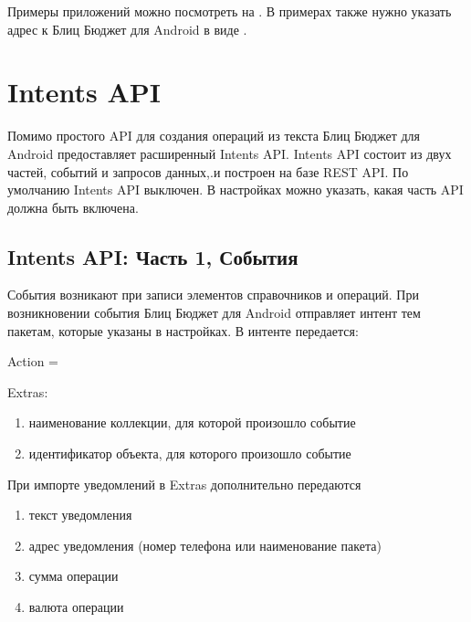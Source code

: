 \documentclass[a4paper,10pt,russian]{sphinxmanual}
\begin{document}
\sphinxAtStartPar
Примеры приложений можно посмотреть на . В примерах также нужно указать адрес к Блиц Бюджет для Android в виде .


\section{Intents API}
\label{\detokenize{api:intents-api}}
\sphinxAtStartPar
Помимо простого API для создания операций из текста Блиц Бюджет для Android предоставляет расширенный Intents API.
Intents API  состоит из двух частей, событий и запросов данных,.и построен на базе REST API.
По умолчанию Intents API выключен. В настройках можно указать, какая часть API должна быть включена.


\subsection{Intents API: Часть 1, События}
\label{\detokenize{api:intents-api-1}}
\sphinxAtStartPar
События возникают при записи элементов справочников и операций. При возникновении события Блиц Бюджет для Android отправляет интент тем пакетам,
которые указаны в настройках. В интенте передается:

\sphinxAtStartPar
Action = 

\sphinxAtStartPar
Extras:
\begin{enumerate}
%
\item {} 
\sphinxAtStartPar
{} \sphinxhyphen{} наименование коллекции, для которой произошло событие

\item {} 
\sphinxAtStartPar
{} \sphinxhyphen{} идентификатор объекта, для которого произошло событие

\end{enumerate}

\sphinxAtStartPar
При импорте уведомлений в Extras дополнительно передаются
\begin{enumerate}
%
\item {} 
\sphinxAtStartPar
{} \sphinxhyphen{} текст уведомления

\item {} 
\sphinxAtStartPar
{} \sphinxhyphen{} адрес уведомления (номер телефона или наименование пакета)

\item {} 
\sphinxAtStartPar
{} \sphinxhyphen{} сумма операции

\item {} 
\sphinxAtStartPar
{} \sphinxhyphen{} валюта операции

\end{enumerate}
\end{document}
